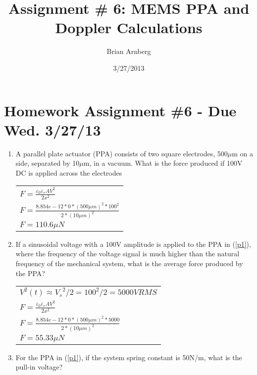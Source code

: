 \documentclass{article}
\title{Assignment \# 6: MEMS PPA and Doppler Calculations}
\date{3/27/2013}
\author{Brian Arnberg}
\begin{document}
\label{start}



\section*{ Homework Assignment \#6 - Due Wed. 3/27/13 }
\renewcommand{\labelenumi}{\arabic{enumi})}
\begin{multicols}{2}
\begin{enumerate}
\item\label{p1}
 A parallel plate actuator (PPA) consists of two square electrodes, 500$\mu$m on a
     side, separated by 10$\mu$m, in a vacuum. What is the force produced if 100V DC is
     applied across the electrodes

		\begin{tabular}{ l }
			$F = \frac{\varepsilon_0 \varepsilon_r A V^2}{2 x^2}$\\
			$F = \frac{8.854e-12*0*(500\mu m)^2*100^2}{2*(10\mu m)^2}$\\
			$F = 110.6 \mu N$
		\end{tabular}
\item\label{p2}
     If a sinusoidal voltage with a 100V amplitude is applied to the PPA in (\ref{p1}), where
     the frequency of the voltage signal is much higher than the natural frequency of
     the mechanical system, what is the average force produced by the PPA?

		\begin{tabular}{ l }
			$V^2(t) \approx {V_s}^2/2 = 100^2/2 = 5000V RMS$\\
			$F = \frac{\varepsilon_0 \varepsilon_r A V^2}{2 x^2}$\\
			$F = \frac{8.854e-12*0*(500\mu m)^2*5000}{2*(10\mu m)^2}$\\
			$F = 55.33 \mu N$
		\end{tabular}
  
\item\label{p3}
     For the PPA in (\ref{p1}), if the system spring constant is 50N/m, what is the pull-in
     voltage?


\end{enumerate}
\end{multicols}
\end{document}
